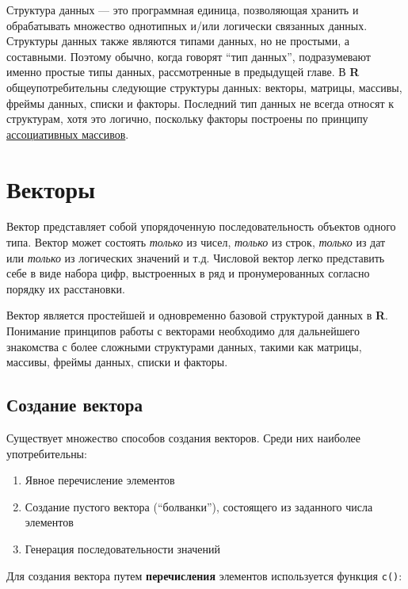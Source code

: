 \documentclass[]{book}
\providecommand{\tightlist}{%
  \setlength{\itemsep}{0pt}\setlength{\parskip}{0pt}}
\begin{document}
Структура данных --- это программная единица, позволяющая хранить и
обрабатывать множество однотипных и/или логически связанных данных.
Структуры данных также являются типами данных, но не простыми, а
составными. Поэтому обычно, когда говорят ``тип данных'', подразумевают
именно простые типы данных, рассмотренные в предыдущей главе. В
\textbf{R} общеупотребительны следующие структуры данных: векторы,
матрицы, массивы, фреймы данных, списки и факторы. Последний тип данных
не всегда относят к структурам, хотя это логично, поскольку факторы
построены по принципу
\href{https://ru.wikipedia.org/wiki/Ассоциативный_массив}{ассоциативных
массивов}.

\section{Векторы}

Вектор представляет собой упорядоченную последовательность объектов
одного типа. Вектор может состоять \emph{только} из чисел, \emph{только}
из строк, \emph{только} из дат или \emph{только} из логических значений
и т.д. Числовой вектор легко представить себе в виде набора цифр,
выстроенных в ряд и пронумерованных согласно порядку их расстановки.

Вектор является простейшей и одновременно базовой структурой данных в
\textbf{R}. Понимание принципов работы с векторами необходимо для
дальнейшего знакомства с более сложными структурами данных, такими как
матрицы, массивы, фреймы данных, списки и факторы.

\subsection{Создание вектора}\label{vector_creation}

Существует множество способов создания векторов. Среди них наиболее
употребительны:

\begin{enumerate}
\def\labelenumi{\arabic{enumi}.}
\tightlist
\item
  Явное перечисление элементов
\item
  Создание пустого вектора (``болванки''), состоящего из заданного числа
  элементов
\item
  Генерация последовательности значений
\end{enumerate}

Для создания вектора путем \textbf{перечисления} элементов используется
функция \texttt{c()}:
\end{document}
